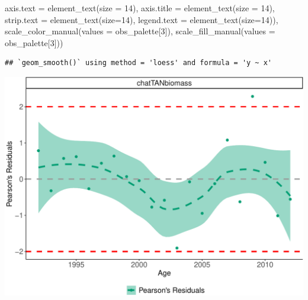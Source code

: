\documentclass[
]{book}
\newenvironment{Shaded}{\begin{snugshade}}{\end{snugshade}}
\newcommand{\AttributeTok}[1]{\textcolor[rgb]{0.77,0.63,0.00}{#1}}
\newcommand{\DecValTok}[1]{\textcolor[rgb]{0.00,0.00,0.81}{#1}}
\newcommand{\DocumentationTok}[1]{\textcolor[rgb]{0.56,0.35,0.01}{\textbf{\textit{#1}}}}
\newcommand{\FunctionTok}[1]{\textcolor[rgb]{0.00,0.00,0.00}{#1}}
\newcommand{\NormalTok}[1]{#1}
\newcommand{\SpecialCharTok}[1]{\textcolor[rgb]{0.00,0.00,0.00}{#1}}
\begin{document}
\begin{Shaded}
\begin{Highlighting}[]
        \AttributeTok{axis.text =} \FunctionTok{element\_text}\NormalTok{(}\AttributeTok{size =} \DecValTok{14}\NormalTok{), }
        \AttributeTok{axis.title =} \FunctionTok{element\_text}\NormalTok{(}\AttributeTok{size =} \DecValTok{14}\NormalTok{),}
        \AttributeTok{strip.text =} \FunctionTok{element\_text}\NormalTok{(}\AttributeTok{size=}\DecValTok{14}\NormalTok{),}
        \AttributeTok{legend.text =} \FunctionTok{element\_text}\NormalTok{(}\AttributeTok{size=}\DecValTok{14}\NormalTok{)),}
  \FunctionTok{scale\_color\_manual}\NormalTok{(}\AttributeTok{values =}\NormalTok{ obs\_palette[}\DecValTok{3}\NormalTok{]),}
  \FunctionTok{scale\_fill\_manual}\NormalTok{(}\AttributeTok{values =}\NormalTok{ obs\_palette[}\DecValTok{3}\NormalTok{]))}
\end{Highlighting}
\end{Shaded}

\begin{verbatim}
## `geom_smooth()` using method = 'loess' and formula = 'y ~ x'
\end{verbatim}

\includegraphics{_main_files/figure-latex/plot_resid_index-1.pdf}

\begin{Shaded}
\end{Shaded}
\end{document}
